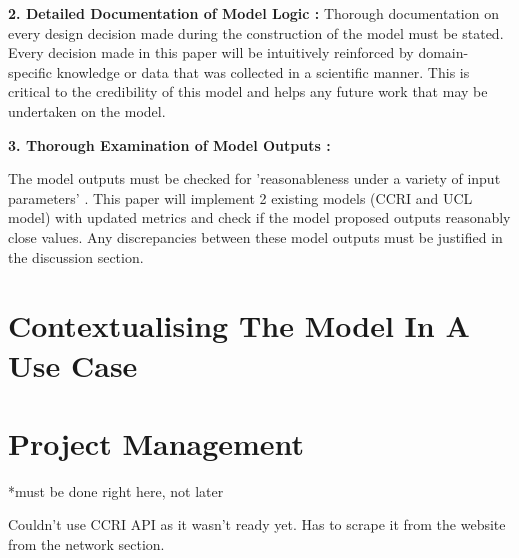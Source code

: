 \textbf{2. Detailed Documentation of Model Logic :}
Thorough documentation on every design decision made during the construction of the model must be stated. Every decision made in this paper will be intuitively reinforced by domain-specific knowledge or data that was collected in a scientific manner. This is critical to the credibility of this model and helps any future work that may be undertaken on the model.



\textbf{3. Thorough Examination of Model Outputs :}

The model outputs must be checked for 'reasonableness under a variety of input parameters' \cite{Al-Aomar2015ModelTechniques}. This paper will implement 2 existing models (CCRI and UCL model) with updated metrics and check if the model proposed outputs reasonably close values. Any discrepancies between these model outputs must be justified in the discussion section.   




\section {Contextualising The Model In A Use Case}

\section {Project Management}
*must be done right here, not later

Couldn't use CCRI API as it wasn't ready yet. Has to scrape it from the website from the network section.